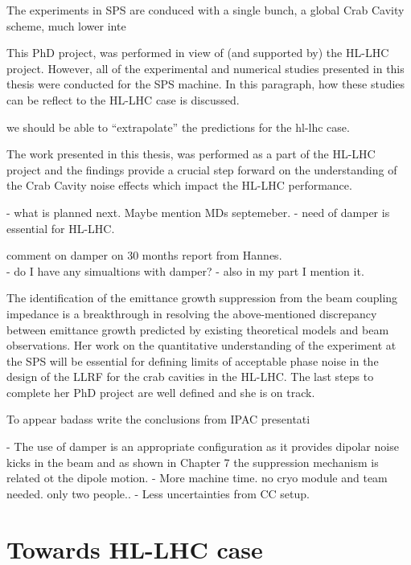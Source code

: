 \newpage

The experiments in SPS are conduced with a single bunch, a global Crab Cavity scheme, much lower inte





This PhD project, was performed in view of (and supported by) the HL-LHC project. However, all of the experimental and numerical studies presented in this thesis were conducted for the SPS machine. In this paragraph, how these studies can be reflect to the HL-LHC case is discussed.



we should be able to “extrapolate” the predictions for  the hl-lhc case. 


The work presented in this thesis, was performed as a part of the HL-LHC project and the findings provide a crucial step forward on the understanding of the Crab Cavity noise effects which impact the HL-LHC performance. 


- what is planned next. Maybe mention MDs septemeber. 
- need of damper is essential for HL-LHC.

comment on damper on 30 months report from Hannes.\\
- do I have any simualtions with damper?
- also in my part I mention it.

The identification of the emittance growth suppression from the beam coupling impedance is a breakthrough in resolving the above-mentioned discrepancy between emittance growth predicted by existing theoretical models and beam observations. Her work on the quantitative understanding of the experiment at the SPS will be essential for defining limits of acceptable phase noise in the design of the LLRF for the crab cavities in the HL-LHC. The last steps to complete her PhD project are well defined and she is on track.








To appear badass write the conclusions from IPAC presentati


\newpage
- The use of damper is an appropriate configuration as it provides dipolar noise kicks in the beam and as shown in Chapter 7 the suppression mechanism is related ot the dipole motion. 
- More machine time. no cryo module and team needed. only two people..
- Less uncertainties from CC setup.




\section{Towards HL-LHC case}
